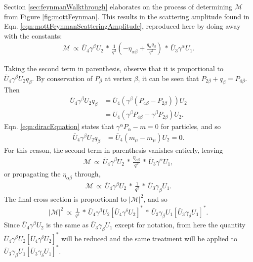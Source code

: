 Section \ref{sec:feynmanWalkthrough} elaborates on the process of determining $\mathcal{M}$ from Figure \ref{fig:mottFeynman}. This results in the scattering amplitude found in Eqn. \ref{eqn:mottFeynmanScatteringAmplitude}, reproduced here by doing away with the constants:
\begin{align*}
\mathcal{M} \, \propto \, \bar{U}_4\gamma^\beta U_2 \, * \, \frac{1}{q^2}(-\eta_{\alpha\beta}+\frac{q_\alpha q_\beta}{q^2}) \, *\, \bar{U}_3\gamma^\alpha U_1.
\end{align*}

Taking the second term in parenthesis, observe that it is proportional to $\bar{U}_4\gamma^\beta U_2 q_\beta$. By conservation of $P_\beta$ at vertex $\beta$, it can be seen that $P_{2\beta}+q_\beta=P_{4\beta}$. Then
\begin{align*}
\bar{U}_4\gamma^\beta U_2 q_\beta&= \bar{U}_4(\gamma^\beta(P_{4\beta}-P_{2\beta})) U_2\\
&= \bar{U}_4(\gamma^\beta P_{4\beta}-\gamma^\beta P_{2\beta}) U_2 .
\end{align*}
Eqn. \ref{eqn:diracEquation} states that $\gamma^\alpha P_\alpha-m=0$ for particles, and so
\begin{align*}
\bar{U}_4\gamma^\beta U_2 q_\beta &= \bar{U}_4 (m_\mu-m_\mu) U_2=0.
\end{align*}
For this reason, the second term in parenthesis vanishes entierly, leaving
\begin{align*}
\mathcal{M} \, \propto \, \bar{U}_4\gamma^\beta U_2 \, * \, \frac{\eta_{\alpha\beta}}{q^2}\, *\, \bar{U}_3\gamma^\alpha U_1,
\end{align*}
or propagating the $\eta_{\alpha\beta}$ through,
\begin{align*}
\mathcal{M} \, \propto \, \bar{U}_4\gamma^\beta U_2 \, * \, \frac{1}{q^2}\, *\, \bar{U}_3\gamma_\beta U_1.
\end{align*}
The final cross section is proportional to $|\mathcal{M}|^2$, and so
\begin{align*}
|\mathcal{M}|^2 \, \propto \, \frac{1}{q^4}\, *\, \bar{U}_4\gamma^\beta U_2 [\bar{U}_4\gamma^\delta U_2]^* \, * \,  \bar{U}_3\gamma_\beta U_1 [\bar{U}_3\gamma_\delta U_1]^*.
\end{align*}
Since $\bar{U}_4\gamma^\beta U_2$ is the same as $\bar{U}_3\gamma_\beta U_1$ except for notation, from here the quantity $\bar{U}_4\gamma^\beta U_2 [\bar{U}_4\gamma^\delta U_2]^* $ will be reduced and the same treatment will be applied to $\bar{U}_3\gamma_\beta U_1 [\bar{U}_3\gamma_\delta U_1]^*$.

